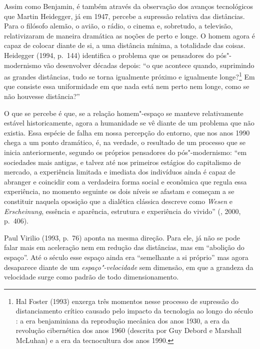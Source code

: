 Assim como Benjamin, é também através da observação dos avanços
tecnológicos que Martin Heidegger, já em 1947, percebe a supressão
relativa das distâncias. Para o filósofo alemão, o avião, o rádio, o
cinema e, sobretudo, a televisão, relativizaram de maneira dramática as
noções de perto e longe. O homem agora é capaz de colocar diante de si,
a uma distância mínima, a totalidade das coisas. Heidegger (1994, p.~144) identifica o problema que os pensadores do pós"-modernismo vão
desenvolver décadas depois: ``o que acontece quando, suprimindo as
grandes distâncias, tudo se torna igualmente próximo e igualmente longe?\footnote{Hal Foster (1993) enxerga três momentos nesse processo de
  supressão do distanciamento crítico causado pelo impacto da tecnologia
  ao longo do século : a era benjaminiana da reprodução mecânica dos
  anos 1930, a era da revolução cibernética dos anos 1960 (descrita por
  Guy Debord e Marshall McLuhan) e a era da tecnocultura dos anos 1990.}
Em que consiste essa uniformidade em que nada está nem perto nem longe,
como se não houvesse distância?''

O que se percebe é que, se a relação homem"-espaço se manteve
relativamente estável historicamente, agora a humanidade se vê diante de
um problema que não existia. Essa espécie de falha em nossa percepção do
entorno, que nos anos 1990 chega a um ponto dramático, é, na verdade, o
resultado de um processo que se inicia anteriormente, segundo os
próprios pensadores do pós"-modernismo: ``em sociedades mais antigas, e
talvez até nos primeiros estágios do capitalismo de mercado, a
experiência limitada e imediata dos indivíduos ainda é capaz de abranger
e coincidir com a verdadeira forma social e econômica que regula essa
experiência, no momento seguinte os dois níveis se afastam e começam a
se constituir naquela oposição que a dialética clássica descreve como
\emph{Wesen} e \emph{Erscheinung}, essência e aparência, estrutura e
experiência do vivido'' (, 2000, p.~406).

Paul Virilio (1993, p.~76) aponta na mesma direção.
Para ele, já não se pode falar mais em aceleração nem em redução das
distâncias, mas em ``abolição do espaço''. Até o século  esse espaço
ainda era ``semelhante a si próprio'' mas agora desaparece diante de um
\emph{espaço"-velocidade} sem dimensão, em que a grandeza da velocidade
surge como padrão de todo dimensionamento.


